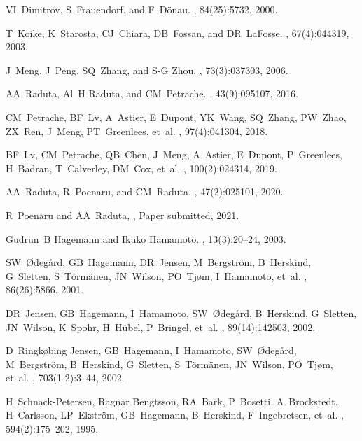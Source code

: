 \documentclass[myclassdoc,debug]{rjparticle}
\begin{document}
\begin{thebibliography}{99}
VI~Dimitrov, S~Frauendorf, and F~D{\"o}nau.
, 84(25):5732, 2000.

T~Koike, K~Starosta, CJ~Chiara, DB~Fossan, and DR~LaFosse.
, 67(4):044319, 2003.

J~Meng, J~Peng, SQ~Zhang, and S-G Zhou.
, 73(3):037303, 2006.

AA~Raduta, Al~H Raduta, and CM~Petrache.
,
  43(9):095107, 2016.

CM~Petrache, BF~Lv, A~Astier, E~Dupont, YK~Wang, SQ~Zhang, PW~Zhao, ZX~Ren,
  J~Meng, PT~Greenlees, et~al.
, 97(4):041304, 2018.

BF~Lv, CM~Petrache, QB~Chen, J~Meng, A~Astier, E~Dupont, P~Greenlees, H~Badran,
  T~Calverley, DM~Cox, et~al.
, 100(2):024314, 2019.

AA~Raduta, R~Poenaru, and CM~Raduta.
,
  47(2):025101, 2020.
  
R~Poenaru and AA~Raduta,
,
  Paper submitted, 2021.

Gudrun~B Hagemann and Ikuko Hamamoto.
, 13(3):20--24, 2003.

SW~{\O}deg{\aa}rd, GB~Hagemann, DR~Jensen, M~Bergstr{\"o}m, B~Herskind,
  G~Sletten, S~T{\"o}rm{\"a}nen, JN~Wilson, PO~Tj{\o}m, I~Hamamoto, et~al.
, 86(26):5866, 2001.

DR~Jensen, GB~Hagemann, I~Hamamoto, SW~{\O}deg{\aa}rd, B~Herskind, G~Sletten,
  JN~Wilson, K~Spohr, H~H{\"u}bel, P~Bringel, et~al.
, 89(14):142503, 2002.

D~Ringk{\o}bing Jensen, GB~Hagemann, I~Hamamoto, SW~{\O}deg{\aa}rd,
  M~Bergstr{\"o}m, B~Herskind, G~Sletten, S~T{\"o}rm{\"a}nen, JN~Wilson,
  PO~Tj{\o}m, et~al.
, 703(1-2):3--44, 2002.

H~Schnack-Petersen, Ragnar Bengtsson, RA~Bark, P~Bosetti, A~Brockstedt,
  H~Carlsson, LP~Ekstr{\"o}m, GB~Hagemann, B~Herskind, F~Ingebretsen, et~al.
, 594(2):175--202, 1995.


\end{thebibliography}
\end{document}
